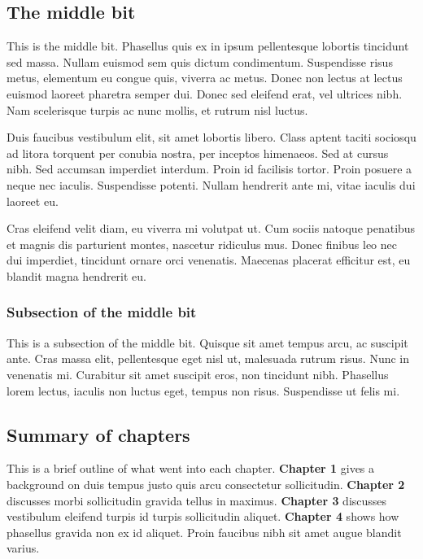 \documentclass[11pt,letterpaper,]{article}
\begin{document}
\subsection{The middle bit}\label{the-middle-bit}

This is the middle bit. Phasellus quis ex in ipsum pellentesque lobortis
tincidunt sed massa. Nullam euismod sem quis dictum condimentum.
Suspendisse risus metus, elementum eu congue quis, viverra ac metus.
Donec non lectus at lectus euismod laoreet pharetra semper dui. Donec
sed eleifend erat, vel ultrices nibh. Nam scelerisque turpis ac nunc
mollis, et rutrum nisl luctus.

Duis faucibus vestibulum elit, sit amet lobortis libero. Class aptent
taciti sociosqu ad litora torquent per conubia nostra, per inceptos
himenaeos. Sed at cursus nibh. Sed accumsan imperdiet interdum. Proin id
facilisis tortor. Proin posuere a neque nec iaculis. Suspendisse
potenti. Nullam hendrerit ante mi, vitae iaculis dui laoreet eu.

Cras eleifend velit diam, eu viverra mi volutpat ut. Cum sociis natoque
penatibus et magnis dis parturient montes, nascetur ridiculus mus. Donec
finibus leo nec dui imperdiet, tincidunt ornare orci venenatis. Maecenas
placerat efficitur est, eu blandit magna hendrerit eu.

\subsubsection{Subsection of the middle
bit}\label{subsection-of-the-middle-bit}

This is a subsection of the middle bit. Quisque sit amet tempus arcu, ac
suscipit ante. Cras massa elit, pellentesque eget nisl ut, malesuada
rutrum risus. Nunc in venenatis mi. Curabitur sit amet suscipit eros,
non tincidunt nibh. Phasellus lorem lectus, iaculis non luctus eget,
tempus non risus. Suspendisse ut felis mi.

\subsection{Summary of chapters}\label{summary-of-chapters}

This is a brief outline of what went into each chapter. \textbf{Chapter
1} gives a background on duis tempus justo quis arcu consectetur
sollicitudin. \textbf{Chapter 2} discusses morbi sollicitudin gravida
tellus in maximus. \textbf{Chapter 3} discusses vestibulum eleifend
turpis id turpis sollicitudin aliquet. \textbf{Chapter 4} shows how
phasellus gravida non ex id aliquet. Proin faucibus nibh sit amet augue
blandit varius.
\end{document}

